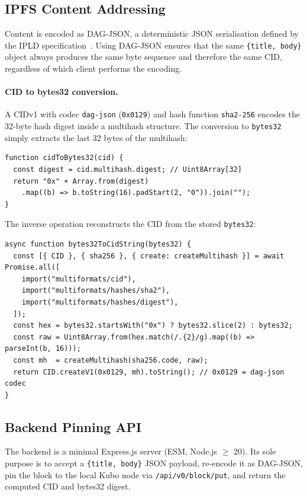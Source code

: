 \documentclass[11pt]{article}
\begin{document}
\subsection{IPFS Content Addressing}

Content is encoded as DAG-JSON, a deterministic JSON serialisation defined by the IPLD specification~\cite{ipld2023}. Using DAG-JSON ensures that the same \texttt{\{title, body\}} object always produces the same byte sequence and therefore the same CID, regardless of which client performs the encoding.

\paragraph{CID to bytes32 conversion.}
A CIDv1 with codec \texttt{dag-json} (\texttt{0x0129}) and hash function \texttt{sha2-256} encodes the 32-byte hash digest inside a multihash structure. The conversion to \texttt{bytes32} simply extracts the last 32 bytes of the multihash:

\begin{lstlisting}[style=command]
function cidToBytes32(cid) {
  const digest = cid.multihash.digest; // Uint8Array[32]
  return "0x" + Array.from(digest)
    .map((b) => b.toString(16).padStart(2, "0")).join("");
}
\end{lstlisting}

The inverse operation reconstructs the CID from the stored \texttt{bytes32}:

\begin{lstlisting}[style=command]
async function bytes32ToCidString(bytes32) {
  const [{ CID }, { sha256 }, { create: createMultihash }] = await Promise.all([
    import("multiformats/cid"),
    import("multiformats/hashes/sha2"),
    import("multiformats/hashes/digest"),
  ]);
  const hex = bytes32.startsWith("0x") ? bytes32.slice(2) : bytes32;
  const raw = Uint8Array.from(hex.match(/.{2}/g).map((b) => parseInt(b, 16)));
  const mh  = createMultihash(sha256.code, raw);
  return CID.createV1(0x0129, mh).toString(); // 0x0129 = dag-json codec
}
\end{lstlisting}

\subsection{Backend Pinning API}

The backend is a minimal Express.js server (ESM, Node.js $\geq$ 20). Its sole purpose is to accept a \texttt{\{title, body\}} JSON payload, re-encode it as DAG-JSON, pin the block to the local Kubo node via \texttt{/api/v0/block/put}, and return the computed CID and bytes32 digest.
\end{document}
